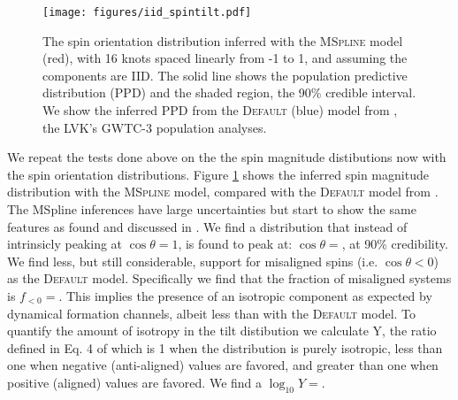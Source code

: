 \begin{figure}
    \texttt{[image: figures/iid\_spintilt.pdf]}
    \caption{The spin orientation distribution inferred with the \textsc{MSpline} model (red), with 16 knots spaced linearly from -1 to 1, and 
    assuming the components are IID. The solid line shows the population predictive distribution (PPD) and the shaded region, the 90\% credible interval. 
    We show the inferred PPD from the \textsc{Default} (blue) model from \citet{o3b_astro_dist}, the LVK's GWTC-3 population analyses.}
    \label{fig:iid_spintilt_dist}
\end{figure}

We repeat the tests done above on the the spin magnitude distibutions now with the spin orientation distributions. Figure \ref{fig:iid_spintilt_dist} 
shows the inferred spin magnitude distribution with the \textsc{MSpline} model, compared with the \textsc{Default} model from \citet{o3b_astro_dist}. 
The MSpline inferences have large uncertainties but start to show the same features as found and discussed in \citet{spinitasyoulike}. 
We find a distribution that instead of intrinsicly peaking at $\cos{\theta}=1$, is found to peak at: $\cos{\theta}=$\result{$\CIPlusMinus{\macros[MSplineIIDCompSpins][peakCosTilt]}$}, at 
90\% credibility. We find less, but still considerable, support for misaligned spins (i.e. $\cos{\theta}<0$) as the \textsc{Default} model. Specifically we 
find that the fraction of misaligned systems is $f_{<0}=$\result{$\CIPlusMinus{\macros[MSplineIIDCompSpins][negFrac]}$}. This implies 
the presence of an isotropic component as expected by dynamical formation channels, albeit less than with the \textsc{Default} model. To quantify the 
amount of isotropy in the tilt distibution we calculate Y, the ratio defined in Eq. 4 of \citet{spinitasyoulike} which is 1 when the distribution is 
purely isotropic, less than one when negative (anti-aligned) values are favored, and greater than one when positive (aligned) values are favored.
We find a $\log_{10}Y=$. 

